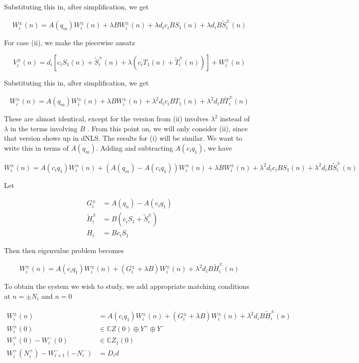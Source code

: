 \documentclass[12pt]{article}
\def\C{{\mathbb C}}
\begin{document}
Substituting this in, after simplification, we get

\[
W_i^\pm(n) = A(q_m) W_i^\pm(n) + \lambda B W_i^\pm(n) + \lambda d_i c_i B S_1(n) + \lambda d_i B \tilde{S}_i^\pm(n)
\]

For case (ii), we make the piecewise ansatz

\[
V_i^\pm(n) = d_i [ c_i S_1(n) + \tilde{S}_i^\pm(n) + \lambda(c_i T_1(n) + \tilde{T}_i^\pm(n))] + W_i^\pm(n)
\]

Substituting this in, after simplification, we get

\[
W_i^\pm(n) = A(q_m) W_i^\pm(n) + \lambda B W_i^\pm(n) + \lambda^2 d_i c_i B T_1(n) + \lambda^2 d_i B \tilde{T}_i^\pm(n)
\]

These are almost identical, except for the version from (ii) involves $\lambda^2$ instead of $\lambda$ in the terms involving $B$ . From this point on, we will only consider (ii), since that version shows up in dNLS. The results for (i) will be similar. We want to write this in terms of $A(q_m)$. Adding and subtracting $A(c_i q_1)$, we have

\[
W_i^\pm(n) = A(c_i q_1) W_i^\pm(n) + (A(q_m) - A(c_i q_1)) W_i^\pm(n) + \lambda B W_i^\pm(n) + \lambda^2 d_i c_i B S_1(n) + \lambda^2 d_i B \tilde{S}_i^\pm(n)
\]

Let

\begin{align*}
G_i^\pm &= A(q_n) - A(c_i q_1) \\
\tilde{H}_i^\pm &= B( c_i S_1 + \tilde{S}_i^\pm ) \\
H_i &= B c_i S_1
\end{align*}

Then then eigenvalue problem becomes

\[
W_i^\pm(n) = A(c_i q_1) W_i^\pm(n) + (G_i^\pm + \lambda B) W_i^\pm(n) + \lambda^2 d_i B \tilde{H}_i^\pm(n)
\]

To obtain the system we wish to study, we add appropriate matching conditions at $n = \pm N_i$ and $n = 0$

\begin{align*}
W_i^\pm(n) &= A(c_i q_1) W_i^\pm(n) + (G_i^\pm + \lambda B) W_i^\pm(n) + \lambda^2 d_i B \tilde{H}_i^\pm(n) \\
W_i^\pm(0) &\in \C Z(0) \oplus Y^+ \oplus Y^- \\
W_i^+(0) - W_i^-(0) &\in \C Z_1(0) \\
W_i^+(N_i^+) - W_{i+1}^-(-N_i^-) &= D_i d
\end{align*}
\end{document}
